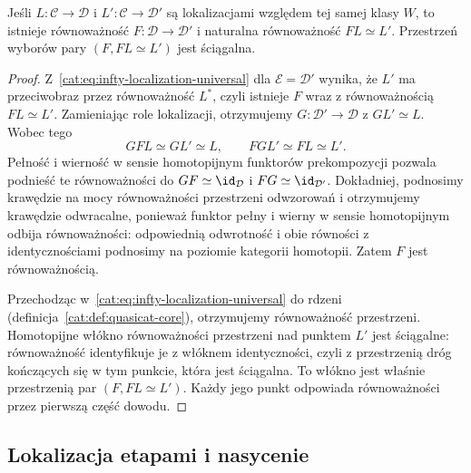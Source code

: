 \begin{stwierdzenie}\label{cat:prop:infty-localization-unique}
Jeśli $L:\mathcal C\to\mathcal D$ i $L':\mathcal C\to\mathcal D'$ są lokalizacjami względem tej samej klasy $W$, to istnieje równoważność $F:\mathcal D\to\mathcal D'$ i naturalna równoważność $FL\simeq L'$. Przestrzeń wyborów pary $(F,FL\simeq L')$ jest ściągalna.
\end{stwierdzenie}
\begin{proof}
Z~\eqref{cat:eq:infty-localization-universal} dla $\mathcal E=\mathcal D'$ wynika, że $L'$ ma przeciwobraz przez równoważność $L^*$, czyli istnieje $F$ wraz z równoważnością $FL\simeq L'$. Zamieniając role lokalizacji, otrzymujemy $G:\mathcal D'\to\mathcal D$ z $GL'\simeq L$. Wobec tego
\[
 GFL\simeq GL'\simeq L,\qquad
 FGL'\simeq FL\simeq L'.
\]
Pełność i wierność w sensie homotopijnym funktorów prekompozycji pozwala podnieść te równoważności do $GF\simeq\id_{\mathcal D}$ i $FG\simeq\id_{\mathcal D'}$. Dokładniej, podnosimy krawędzie na mocy równoważności przestrzeni odwzorowań i otrzymujemy krawędzie odwracalne, ponieważ funktor pełny i wierny w sensie homotopijnym odbija równoważności: odpowiednią odwrotność i obie równości z identycznościami podnosimy na poziomie kategorii homotopii. Zatem $F$ jest równoważnością.

Przechodząc w~\eqref{cat:eq:infty-localization-universal} do rdzeni (definicja~\ref{cat:def:quasicat-core}), otrzymujemy równoważność przestrzeni. Homotopijne włókno równoważności przestrzeni nad punktem $L'$ jest ściągalne: równoważność identyfikuje je z włóknem identyczności, czyli z przestrzenią dróg kończących się w tym punkcie, która jest ściągalna. To włókno jest właśnie przestrzenią par $(F,FL\simeq L')$. Każdy jego punkt odpowiada równoważności przez pierwszą część dowodu.
\end{proof}

\subsection{Lokalizacja etapami i nasycenie}

